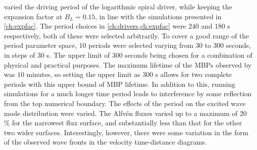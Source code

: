  varied the driving period of the logarithmic spiral driver, while keeping the expansion factor at $B_L = 0.15$, in line with the simulations presented in \cref{ch:expfac}.
The period choices in \cref{ch:drivers,ch:expfac} were $240$ and $180$ s respectively, both of these were selected arbitrarily.
To cover a good range of the period parameter space, $10$ periods were selected varying from $30$ to $300$ seconds, in steps of $30$ s.
The upper limit of $300$ seconds being chosen for a combination of physical and practical purposes.
The maximum lifetime of the MBPs observed by \cite{sanchezalmeida2004} was $10$ minutes, so setting the upper limit as $300$ s allows for two complete periods with this upper bound of MBP lifetime.
In addition to this, running simulations for a much longer time period leads to interference by some reflection from the top numerical boundary.
The effects of the period on the excited wave mode distribution were varied.
The Alfv\'en fluxes varied up to a maximum of $20$ \% for the narrowest flux surface, and substantially less than that for the other two wider surfaces.
Interestingly, however, there were some variation in the form of the observed wave fronts in the velocity time-distance diagrams.